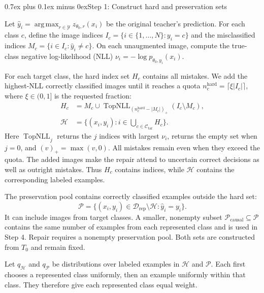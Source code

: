 \documentclass[10pt,journal,compsoc]{IEEEtran}
\makeatletter
\def\subsection{\@startsection{subsection}{2}{\z@}{-3.5ex plus -0.5ex minus -1.5ex}%
{0.7ex plus 0.1ex minus 0ex}{\normalfont\normalsize\sffamily\bfseries}}
\theoremstyle{definition}
\DeclareMathOperator*{\argmax}{arg\,max}
\makeatother
\begin{document}
\subsection{Step 1: Construct hard and preservation sets}

Let $\widehat y_i=\argmax_{r\in\mathcal{Y}}
z_{\theta_0,r}(x_i)$ be the original teacher's prediction.
For each class $c$, define the image indices
$I_c=\{i\in\{1,\ldots,N\}:y_i=c\}$ and the misclassified
indices $M_c=\{i\in I_c:\widehat y_i\ne c\}$.
On each unaugmented image, compute the true-class negative
log-likelihood (NLL)
$\nu_i=-\log p_{\theta_0,y_i}(x_i)$.

For each target class, the hard index set $H_c$ contains
all mistakes. We add the highest-NLL correctly classified
images until it reaches a quota
$n_c^{\mathrm{hard}}=\lceil\xi|I_c|\rceil$, where
$\xi\in(0,1]$ is the requested fraction:
\begin{equation}
\label{eq:repair-hard-set}
\begin{aligned}
H_c&=M_c\cup
\operatorname{TopNLL}_{(n_c^{\mathrm{hard}}-|M_c|)_+}
       (I_c\setminus M_c),\\
\mathcal{H}&=\{(x_i,y_i):i\in
          \bigcup_{c\in\mathcal{C}_{\mathrm{tar}}}H_c\}.
\end{aligned}
\end{equation}
Here $\operatorname{TopNLL}_j$ returns the $j$ indices with
largest $\nu_i$, returns the empty set when $j=0$, and
$(v)_+=\max(v,0)$. All mistakes remain even when they exceed
the quota. The added images make the repair attend to
uncertain correct decisions as well as outright mistakes.
Thus $H_c$ contains indices, while $\mathcal{H}$ contains
the corresponding labeled examples.

The preservation pool contains correctly classified examples
outside the hard set:
\begin{equation}
\label{eq:repair-preservation-set}
\mathcal{P}=
\{(x_i,y_i)\in\mathcal{D}_{\mathrm{rep}}\setminus\mathcal{H}:
  \widehat y_i=y_i\}.
\end{equation}
It can include images from target classes. A smaller,
nonempty subset $\mathcal{P}_{\mathrm{causal}}\subseteq\mathcal{P}$
contains the same number of examples from each represented
class and is used in Step 4. Repair requires a nonempty
preservation pool. Both sets are constructed from $T_0$
and remain fixed.

Let $q_{\mathcal H}$ and $q_{\mathcal P}$ be distributions
over labeled examples in $\mathcal H$ and $\mathcal P$. Each first
chooses a represented class uniformly, then an example
uniformly within that class. They therefore give each
represented class equal weight.
\end{document}
